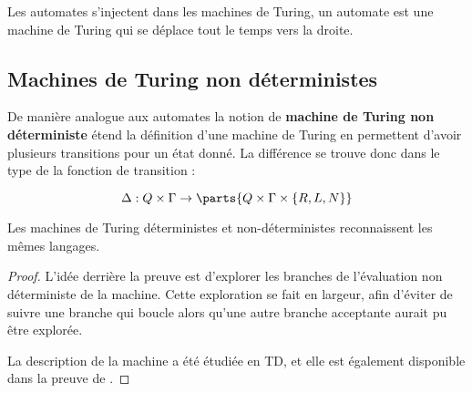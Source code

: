 \begin{remarque}
	Les automates s'injectent dans les machines de Turing, un automate est une machine de Turing qui se déplace tout le temps vers la droite.
\end{remarque}

\subsection{Machines de Turing non déterministes}


\begin{definition}
	De manière analogue aux automates la notion de \textbf{machine de Turing non déterministe} étend la définition d'une machine de Turing en
	permettent d'avoir plusieurs transitions pour un état donné. La différence se trouve donc dans le type de la fonction de transition :

	$$ \Delta: Q \times \Gamma \to \parts{Q \times \Gamma \times \{R, L, N\}}$$
\end{definition}

\begin{prop}
	Les machines de Turing déterministes et non-déterministes reconnaissent les mêmes langages.
\end{prop}

\begin{proof}
	L'idée derrière la preuve est d'explorer les branches de l'évaluation non déterministe de la machine. Cette exploration
	se fait en largeur, afin d'éviter de suivre une branche qui boucle alors qu'une autre branche acceptante aurait pu être explorée.

	La description de la machine a été étudiée en TD, et elle est également disponible dans la preuve de \cite[Theorem~3.16]{sipser}.
\end{proof}
